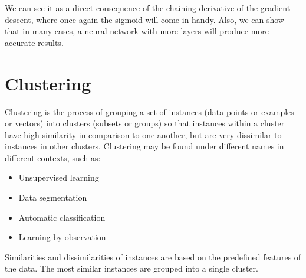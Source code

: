 We can see it as a direct consequence of the chaining derivative of the gradient descent, where once again the sigmoid will come in handy. Also, we can show that in many cases, a neural network with more layers will produce more accurate results.

\chapter{Clustering}
Clustering is the process of grouping a set of instances (data points or
examples or vectors) into clusters (subsets or groups) so that instances
within a cluster have high similarity in comparison to one another, but
are very dissimilar to instances in other clusters.
Clustering may be found under different names in different contexts, such as:
\begin{itemize}
    \item Unsupervised learning
    \item Data segmentation
    \item Automatic classification
    \item Learning by observation
\end{itemize}
Similarities and dissimilarities of instances are based on the predefined features of the data. The most similar instances are grouped into a single
cluster.
